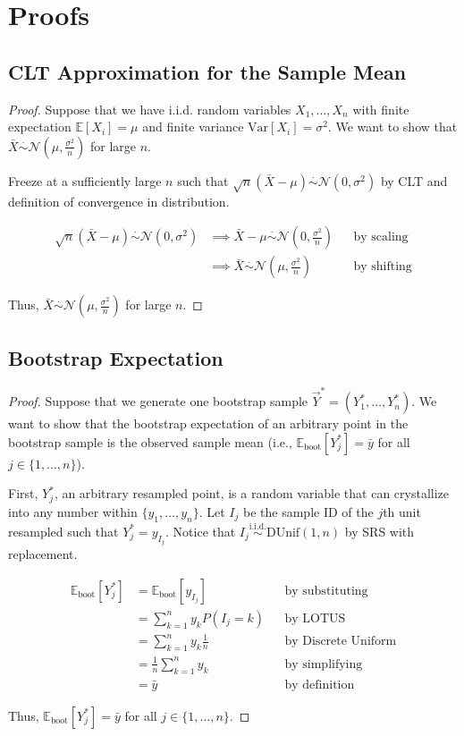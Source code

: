 \documentclass[12pt,oneside]{article}
\newcommand{\E}{\mathbb{E}}
\newcommand{\Var}{\text{Var}}
\newcommand{\boot}{\text{boot}}
\newcommand{\N}{\mathcal{N}}
\newcommand{\DUnif}{\text{DUnif}}
\newcommand{\simiid}{\overset{\text{i.i.d.}}{\sim}}
\newcommand{\simapprox}{\overset{\cdot}{\sim}}
\theoremstyle{definition}
\theoremstyle{remark}
\begin{document}
\appendix
\section{Proofs}

\subsection{CLT Approximation for the Sample Mean}
\label{app:clt-approx}

\begin{proof}
Suppose that we have i.i.d. random variables $X_1, \ldots, X_n$ with finite expectation $\E[X_i] = \mu$ and finite variance $\Var[X_i] = \sigma^2$. We want to show that $\bar{X} \simapprox \N(\mu, \frac{\sigma^2}{n})$ for large $n$.

Freeze at a sufficiently large $n$ such that $\sqrt{n}(\bar{X} - \mu) \simapprox \N(0, \sigma^2)$ by CLT and definition of convergence in distribution. 

\[
\begin{aligned}
\sqrt{n}(\bar{X} - \mu) \simapprox \N(0, \sigma^2) &\implies \bar{X} - \mu \simapprox \N \left( 0, \frac{\sigma^2}{n} \right) && \text{by scaling} \\
&\implies \bar{X} \simapprox \N \left( \mu, \frac{\sigma^2}{n} \right) && \text{by shifting}
\end{aligned}
\]

Thus, $\bar{X} \simapprox \N(\mu, \frac{\sigma^2}{n})$ for large $n$.
\end{proof}

\subsection{Bootstrap Expectation}
\label{app:boot-exp}

\begin{proof}
Suppose that we generate one bootstrap sample $\vec{Y}^* = (Y^*_1, \ldots, Y^*_n)$. We want to show that the bootstrap expectation of an arbitrary point in the bootstrap sample is the observed sample mean (i.e., $\E_{\boot}[Y^*_j] = \bar{y}$ for all $j \in \{1, \ldots, n\}$).

First, $Y^*_j$, an arbitrary resampled point, is a random variable that can crystallize into any number within $\{y_1, \ldots, y_n\}$. Let $I_j$ be the sample ID of the $j$th unit resampled such that $Y^*_j = y_{I_j}$. Notice that $I_j \simiid \DUnif(1, n)$ by SRS with replacement.

\[
\begin{aligned}
\E_{\boot}[Y^*_j] &= \E_{\boot}[y_{I_j}] && \text{by substituting} \\
&= \sum_{k = 1}^{n} y_k P(I_j = k) && \text{by LOTUS} \\
&= \sum_{k = 1}^{n} y_k \frac{1}{n} && \text{by Discrete Uniform} \\
&= \frac{1}{n} \sum_{k = 1}^{n} y_k && \text{by simplifying} \\
&= \bar{y} && \text{by definition}
\end{aligned}
\]

Thus, $\E_{\boot}[Y^*_j] = \bar{y}$ for all $j \in \{1, \ldots, n\}$.
\end{proof}
\end{document}
